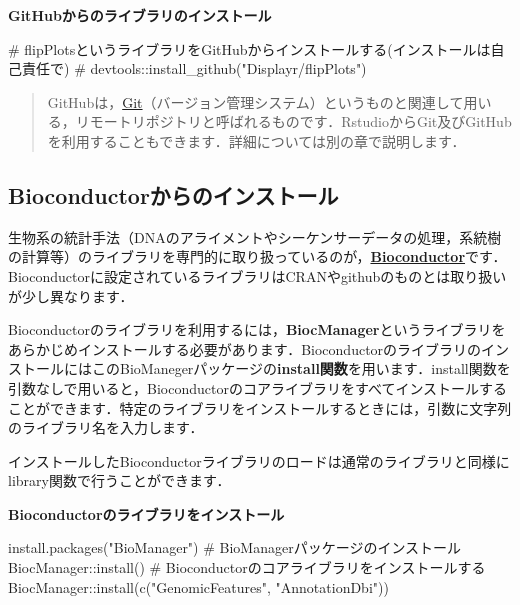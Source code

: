 \documentclass[
  letterpaper,
  DIV=11,
  numbers=noendperiod]{scrreprt}
\newenvironment{Shaded}{\begin{snugshade}}{\end{snugshade}}
\newcommand{\CommentTok}[1]{\textcolor[rgb]{0.37,0.37,0.37}{#1}}
\newcommand{\FunctionTok}[1]{\textcolor[rgb]{0.28,0.35,0.67}{#1}}
\newcommand{\NormalTok}[1]{\textcolor[rgb]{0.00,0.23,0.31}{#1}}
\newcommand{\SpecialCharTok}[1]{\textcolor[rgb]{0.37,0.37,0.37}{#1}}
\newcommand{\StringTok}[1]{\textcolor[rgb]{0.13,0.47,0.30}{#1}}
\begin{document}
\textbf{GitHubからのライブラリのインストール}

\begin{Shaded}
\begin{Highlighting}[]
\CommentTok{\# flipPlotsというライブラリをGitHubからインストールする(インストールは自己責任で)}
\CommentTok{\# devtools::install\_github("Displayr/flipPlots") }
\end{Highlighting}
\end{Shaded}

\begin{quote}
GitHubは，\href{https://git-scm.com/}{Git}（バージョン管理システム）というものと関連して用いる，リモートリポジトリと呼ばれるものです．RstudioからGit及びGitHubを利用することもできます．詳細については別の章で説明します．
\end{quote}

\hypertarget{bioconductorux304bux3089ux306eux30a4ux30f3ux30b9ux30c8ux30fcux30eb}{%
\subsection{Bioconductorからのインストール}\label{bioconductorux304bux3089ux306eux30a4ux30f3ux30b9ux30c8ux30fcux30eb}}

生物系の統計手法（DNAのアライメントやシーケンサーデータの処理，系統樹の計算等）のライブラリを専門的に取り扱っているのが，\href{https://www.bioconductor.org/}{\textbf{Bioconductor}}です．Bioconductorに設定されているライブラリはCRANやgithubのものとは取り扱いが少し異なります．

Bioconductorのライブラリを利用するには，\textbf{BiocManager}というライブラリをあらかじめインストールする必要があります．BioconductorのライブラリのインストールにはこのBioManegerパッケージの\textbf{install関数}を用います．install関数を引数なしで用いると，Bioconductorのコアライブラリをすべてインストールすることができます．特定のライブラリをインストールするときには，引数に文字列のライブラリ名を入力します．

インストールしたBioconductorライブラリのロードは通常のライブラリと同様にlibrary関数で行うことができます．

\textbf{Bioconductorのライブラリをインストール}

\begin{Shaded}
\begin{Highlighting}[]
\FunctionTok{install.packages}\NormalTok{(}\StringTok{"BioManager"}\NormalTok{) }\CommentTok{\# BioManagerパッケージのインストール}
\NormalTok{BiocManager}\SpecialCharTok{::}\FunctionTok{install}\NormalTok{() }\CommentTok{\# Bioconductorのコアライブラリをインストールする}
\NormalTok{BiocManager}\SpecialCharTok{::}\FunctionTok{install}\NormalTok{(}\FunctionTok{c}\NormalTok{(}\StringTok{"GenomicFeatures"}\NormalTok{, }\StringTok{"AnnotationDbi"}\NormalTok{))}
\end{Highlighting}
\end{Shaded}
\end{document}

